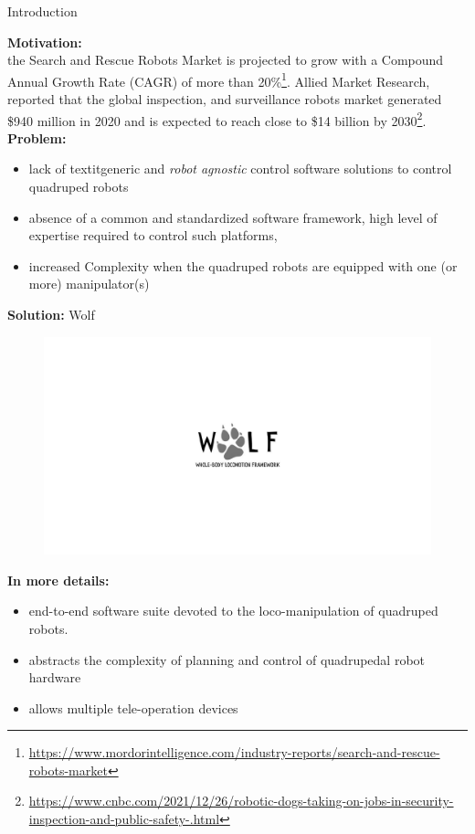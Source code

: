 \begin{myblock}{{\large Introduction}}
	

\textbf{Motivation:}\\
 the Search and Rescue Robots Market is projected to grow with a Compound Annual Growth Rate (CAGR) of more than 20\%\footnote{\url{https://www.mordorintelligence.com/industry-reports/search-and-rescue-robots-market}}.
 Allied Market Research, reported that the global inspection,  and surveillance robots market generated \$940 million in 2020 and is expected to reach close to \$14 billion by 2030\footnote{\url{https://www.cnbc.com/2021/12/26/robotic-dogs-taking-on-jobs-in-security-inspection-and-public-safety-.html}}.	\\
	
	
\textbf{Problem:}\\
\begin{itemize}
	\setlength{\itemindent}{-10pt}
	\item lack of textit{generic} and \textit{robot agnostic} control software solutions to control quadruped robots
	\item  absence of a common and standardized software framework, high level of expertise required to control such platforms,
	\item   increased Complexity  when the quadruped robots are equipped with one (or more) manipulator(s)
\end{itemize}
\vspace{20pt}
	
\textbf{Solution:} Wolf
\begin{figure}[thb!]
	\centering
	\includegraphics[width=0.5\columnwidth, trim={7cm 5.5cm 7cm 5.5cm}, clip=true]{images/wolf-logo.pdf}
	\label{fig:wolf_logo}
\end{figure}

\vspace{20pt}
\textbf{In more details:}\\
\begin{itemize}
	\setlength{\itemindent}{-10pt}
	\item   end-to-end software suite devoted to the loco-manipulation of quadruped robots. 
	\item abstracts the complexity of planning and control of quadrupedal robot hardware 
	\item allows multiple tele-operation devices
	\end{itemize}
\end{myblock} 







